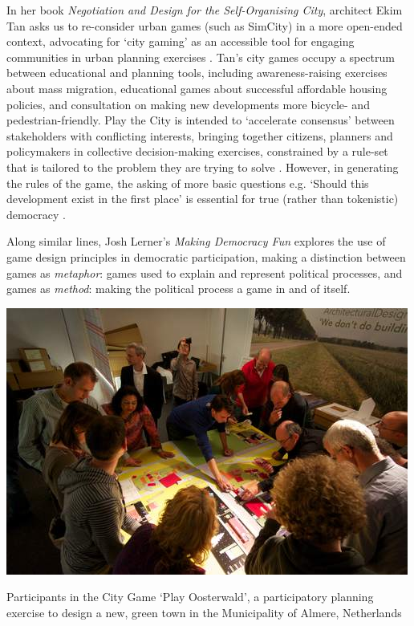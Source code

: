 \documentclass[nofonts,nols,justified,nobib]{tufte-book}
\begin{document}
In her book \emph{Negotiation and Design for the Self-Organising City}, architect Ekim Tan asks us to re-consider urban games (such as SimCity) in a more open-ended context, advocating for `city gaming' as an accessible tool for engaging communities in urban planning exercises \cite{tan_negotiation_2014}. Tan's city games occupy a spectrum between educational and planning tools, including awareness-raising exercises about mass migration, educational games about successful affordable housing policies, and consultation on making new developments more bicycle- and pedestrian-friendly. Play the City is intended to `accelerate consensus' between stakeholders with conflicting interests, bringing together citizens, planners and policymakers in collective decision-making exercises, constrained by a rule-set that is tailored to the problem they are trying to solve \cite{tan_city_2017}. However, in generating the rules of the game, the asking of more basic questions e.g. `Should this development exist in the first place' is essential for true (rather than tokenistic) democracy \cite{shaw_informational_2017}.

Along similar lines, Josh Lerner's \emph{Making Democracy Fun} explores the use of game design principles in democratic participation, making a distinction between games as \emph{metaphor}: games used to explain and represent political processes, and games as \emph{method}: making the political process a game in and of itself.

\begin{marginfigure}
\includegraphics[width=\textwidth]{img/1/play-oosterwald.jpg}
\caption{Participants in the City Game `Play Oosterwald', a participatory planning exercise to design a new, green town in the Municipality of Almere, Netherlands \label{b} \cite{play_the_city_play_2013}}
\end{marginfigure}
\end{document}
